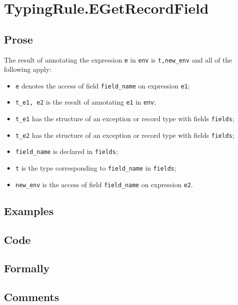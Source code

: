 \documentclass{book}
\begin{document}
 
\section{TypingRule.EGetRecordField \label{sec:TypingRule.EGetRecordField}}

  \subsection{Prose}
  The result of annotating the expression \texttt{e} in \texttt{env} is
\texttt{t,new\_env} and all of the following apply:
  \begin{itemize}
  \item \texttt{e} denotes the access of field \texttt{field\_name} on expression \texttt{e1};
  \item \texttt{t\_e1, e2} is the result of annotating \texttt{e1} in \texttt{env};
  \item \texttt{t\_e1} has the structure of an exception or record type with fields \texttt{fields};
  \item \texttt{t\_e2} has the structure of an exception or record type with fields \texttt{fields};
  \item \texttt{field\_name} is declared in \texttt{fields};
  \item \texttt{t} is the type corresponding to \texttt{field\_name} in \texttt{fields};
  \item \texttt{new\_env} is the access of field \texttt{field\_name} on expression \texttt{e2}.
  \end{itemize}

  \subsection{Examples}

  \subsection{Code}

  \subsection{Formally}

  \subsection{Comments}
\end{document}
